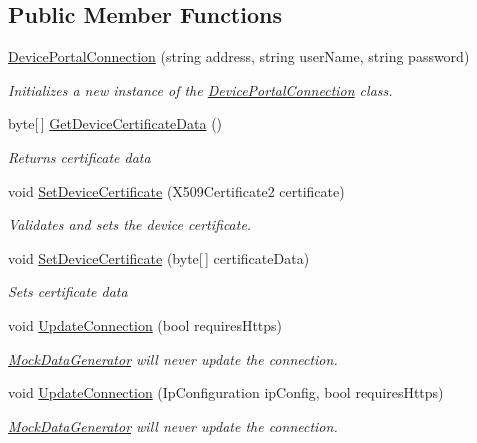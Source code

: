 \subsection*{Public Member Functions}
\begin{DoxyCompactItemize}
\item 
\hyperlink{class_mock_data_generator_1_1_device_portal_connection_ab307f38c29c4a88d27210e060e2cbc25}{Device\+Portal\+Connection} (string address, string user\+Name, string password)
\begin{DoxyCompactList}\small\item\em Initializes a new instance of the \hyperlink{class_mock_data_generator_1_1_device_portal_connection}{Device\+Portal\+Connection} class. \end{DoxyCompactList}\item 
byte\mbox{[}$\,$\mbox{]} \hyperlink{class_mock_data_generator_1_1_device_portal_connection_ad2b1eed1b227892297f509b41b26e79e}{Get\+Device\+Certificate\+Data} ()
\begin{DoxyCompactList}\small\item\em Returns certificate data \end{DoxyCompactList}\item 
void \hyperlink{class_mock_data_generator_1_1_device_portal_connection_a180675ac7bd2766bcd4cf10b11e0cb75}{Set\+Device\+Certificate} (X509\+Certificate2 certificate)
\begin{DoxyCompactList}\small\item\em Validates and sets the device certificate. \end{DoxyCompactList}\item 
void \hyperlink{class_mock_data_generator_1_1_device_portal_connection_a8fc9464b07a5819ec340d1bd1e75b484}{Set\+Device\+Certificate} (byte\mbox{[}$\,$\mbox{]} certificate\+Data)
\begin{DoxyCompactList}\small\item\em Sets certificate data \end{DoxyCompactList}\item 
void \hyperlink{class_mock_data_generator_1_1_device_portal_connection_a7b295b9d2643633e0cccee0dd186bffc}{Update\+Connection} (bool requires\+Https)
\begin{DoxyCompactList}\small\item\em \hyperlink{namespace_mock_data_generator}{Mock\+Data\+Generator} will never update the connection. \end{DoxyCompactList}\item 
void \hyperlink{class_mock_data_generator_1_1_device_portal_connection_a0f45f562b4e19e2d28c4f844bca52a90}{Update\+Connection} (Ip\+Configuration ip\+Config, bool requires\+Https)
\begin{DoxyCompactList}\small\item\em \hyperlink{namespace_mock_data_generator}{Mock\+Data\+Generator} will never update the connection. \end{DoxyCompactList}\end{DoxyCompactItemize}
